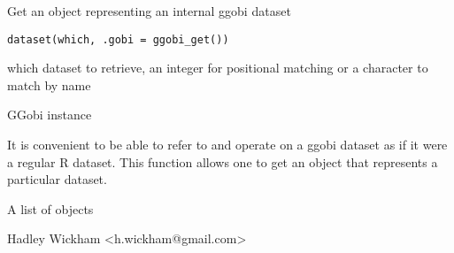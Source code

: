 \documentclass{article}
\begin{document}
\begin{Description}\relax
Get an object representing an internal ggobi dataset
\end{Description}
\begin{Usage}
\begin{verbatim}dataset(which, .gobi = ggobi_get())\end{verbatim}
\end{Usage}
\begin{Arguments}
\begin{ldescription}
\item[\code{which}] which dataset to retrieve, an integer for positional matching or a character to match by name
\item[\code{.gobi}] GGobi instance
\end{ldescription}
\end{Arguments}
\begin{Details}\relax
It is convenient to be able to refer to and operate on a ggobi
dataset as if it were a regular R dataset.  This function allows one to
get an  object that represents a particular
dataset.
\end{Details}
\begin{Value}
A list of  objects
\end{Value}
\begin{Author}\relax
Hadley Wickham <h.wickham@gmail.com>
\end{Author}
\begin{SeeAlso}\relax
{}
\end{SeeAlso}
\begin{Examples}
\begin{ExampleCode}\end{ExampleCode}
\end{Examples}
\end{document}
